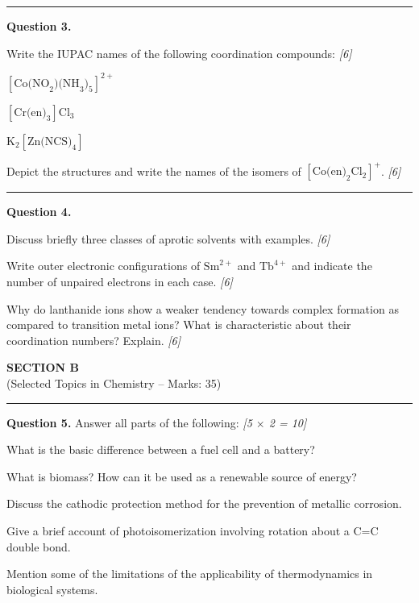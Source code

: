 \documentclass[11pt,a4paper]{article}
\newcommand{\pts}[1]{\hfill   \textit{[#1]}}
\begin{document}
\medskip\rule{\linewidth}{0.2pt}




\noindent   \textbf{Question 3.}

\begin{parts}
  \item Write the IUPAC names of the following coordination compounds: \pts{6}
  
\begin{parts}
    \item $[ \text{Co(NO}_2 \text{)(NH}_3 \text{)}_5]^{2+}$
    \item $[ \text{Cr(en)}_3] \text{Cl}_3$
    \item $ \text{K}_2[ \text{Zn(NCS)}_4]$
  \end{parts}
  \item Depict the structures and write the names of the isomers of $[ \text{Co(en)}_2 \text{Cl}_2]^+$. \pts{6}
\end{parts}

\medskip\rule{\linewidth}{0.2pt}




\noindent   \textbf{Question 4.}

\begin{parts}
  \item Discuss briefly three classes of aprotic solvents with examples. \pts{6}
  \item Write outer electronic configurations of $ \text{Sm}^{2+}$ and $ \text{Tb}^{4+}$ and indicate the number of unpaired electrons in each case. \pts{6}
  \item Why do lanthanide ions show a weaker tendency towards complex formation as compared to transition metal ions? What is characteristic about their coordination numbers? Explain. \pts{6}
\end{parts}


\newpage

\begin{center}
  {\large\bfseries SECTION B}\\[2pt]
  {\normalsize (Selected Topics in Chemistry -- Marks: 35)}
\end{center}
\rule{0.4\linewidth}{0.2pt}
\smallskip




\noindent   \textbf{Question 5.} Answer all parts of the following: \pts{5 $ \times$ 2 = 10}

\begin{parts}
  \item What is the basic difference between a fuel cell and a battery?
  \item What is biomass? How can it be used as a renewable source of energy?
  \item Discuss the cathodic protection method for the prevention of metallic corrosion.
  \item Give a brief account of photoisomerization involving rotation about a $ \text{C=C}$ double bond.
  \item Mention some of the limitations of the applicability of thermodynamics in biological systems.
\end{parts}
\end{document}
